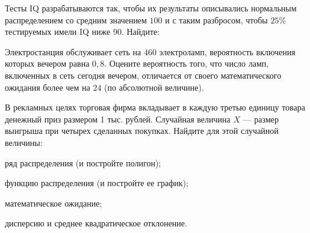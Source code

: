 \vfil

\begin{zkrPlain}{25}\noindent 
	Тесты IQ разрабатываются так, чтобы их результаты описывались нормальным распределением со средним значением $100$ и с таким разбросом, чтобы $25\%$ тестируемых имели IQ ниже $90$. Найдите: \par {}
 
\end{zkrPlain}

\vfil

\begin{zkrPlain}{25}\noindent 
	Электростанция обслуживает сеть на $ 460 $ электроламп, вероятность включения которых вечером равна $ 0{,}8 $. Оцените вероятность того, что число ламп, включенных в сеть сегодня вечером, отличается от своего математического ожидания более чем на $ 24 $ (по абсолютной величине). 
 
\end{zkrPlain}

\newpage\setcounter{zad}{0}\setcounter{footnote}{0}



\begin{zkrPlain}{25}\noindent 
	В рекламных целях торговая фирма вкладывает в каждую третью единицу товара денежный приз размером 1 тыс. рублей. Случайная величина $X$ --- размер выигрыша при четырех сделанных покупках.  Найдите для этой случайной величины: \par \smallskip\small{ \par \zz ряд распределения (и постройте полигон); \par \zz функцию распределения (и постройте ее график); \par \zz математическое ожидание; \par \zz дисперсию и среднее квадратическое отклонение.\par \par}
 
\end{zkrPlain}

\vfil

